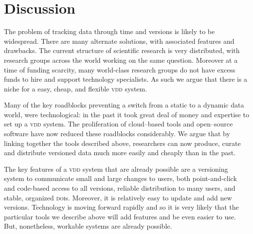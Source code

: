 \documentclass[a4paper,11pt]{article}
\begin{document}
\section{Discussion}

The problem of tracking data through time and versions is likely to be widespread. There are many alternate solutions, with associated features and drawbacks.  The current structure of scientific research is very distributed, with research groups across the world working on the same question.  Moreover at a time of funding scarcity, many world-class research groups do not have excess funds to hire and support technology specialists.  As such we argue that there is a niche for a easy, cheap, and flexible \textsc{vdd} system.

Many of the key roadblocks preventing a switch from a static to a dynamic data world, were technological: in the past it took great deal of money and expertise to set up a \textsc{vdd} system. The proliferation of cloud--based tools and open--source software have now reduced these roadblocks considerably.  We argue that by linking together the tools described above, researchers can now produce, curate and distribute versioned data much more easily and cheaply than in the past.

The key features of a \textsc{vdd} system that are already possible are a versioning system to communicate small and large changes to users, both point-and-click and code-based access to all versions, reliable distribution to many users, and stable, organized \textsc{doi}s.  Moreover, it is relatively easy to update and add new versions.  Technology is moving forward rapidly and so it is very likely that the particular tools we describe above will add features and be even easier to use.  But, nonetheless, workable systems are already possible.



%
%
\end{document}

